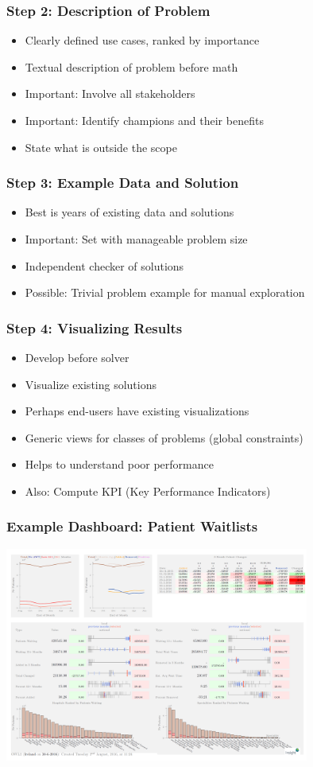 \begin{frame}
\frametitle{Step 2: Description of Problem}
\begin{itemize}
\item Clearly defined use cases, ranked by importance
\item Textual description of problem before math
\item Important: Involve all stakeholders
\item Important: Identify champions and their benefits
  \item State what is outside the scope
\end{itemize}
\end{frame}

\begin{frame}
\frametitle{Step 3: Example Data and Solution}
\begin{itemize}
\item Best is years of existing data and solutions
\item Important: Set with manageable problem size
\item Independent checker of solutions
  \item Possible: Trivial problem example for manual exploration
\end{itemize}
\end{frame}

\begin{frame}
\frametitle{Step 4: Visualizing Results}
\begin{itemize}
\item Develop before solver
\item Visualize existing solutions
\item Perhaps end-users have existing visualizations
\item Generic views for classes of problems (global constraints)
  \item Helps to understand poor performance
  \item Also: Compute KPI (Key Performance Indicators)
\end{itemize}
\end{frame}

\begin{frame}
  \frametitle{Example Dashboard: Patient Waitlists}
  \includegraphics[width=10cm]{../methodology/ntpf}
  \end{frame}

